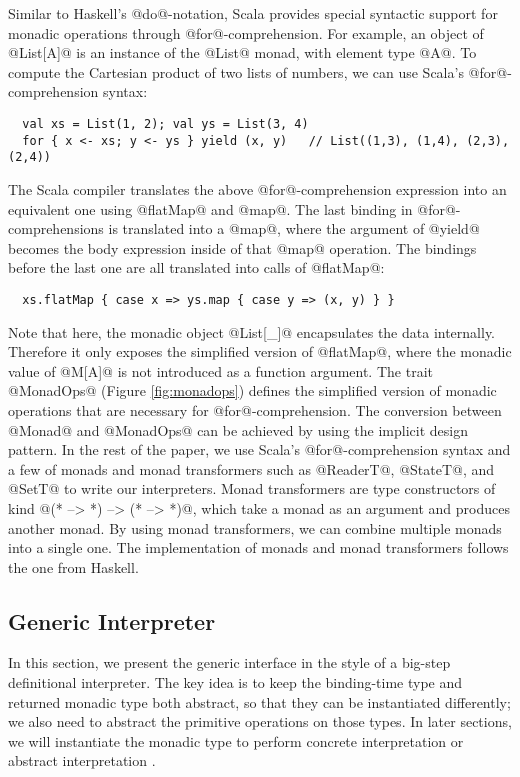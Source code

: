 Similar to Haskell's @do@-notation, Scala provides special syntactic support
for monadic operations through @for@-comprehension.  For example, an object of
@List[A]@ is an instance of the @List@ monad, with element type @A@.
To compute the Cartesian product of two lists of numbers, we can use Scala's
@for@-comprehension syntax:
\begin{lstlisting}
  val xs = List(1, 2); val ys = List(3, 4)
  for { x <- xs; y <- ys } yield (x, y)   // List((1,3), (1,4), (2,3), (2,4))
\end{lstlisting}

The Scala compiler translates the above @for@-comprehension expression into
an equivalent one using @flatMap@ and @map@. The last binding
in @for@-comprehensions is translated into a @map@, where the argument of
@yield@ becomes the body expression inside of that @map@ operation. The
bindings before the last one are all translated into calls of @flatMap@:
\begin{lstlisting}
  xs.flatMap { case x => ys.map { case y => (x, y) } }
\end{lstlisting}

Note that here, the monadic object @List[_]@ encapsulates the data internally.
Therefore it only exposes the simplified version of @flatMap@, where the monadic
value of @M[A]@ is not introduced as a function argument. The trait @MonadOps@ (Figure
\ref{fig:monadops}) defines the simplified version of monadic operations that
are necessary for @for@-comprehension. The conversion between @Monad@ and
@MonadOps@ can be achieved by using the implicit design pattern.
In the rest of the paper, we use Scala's @for@-comprehension syntax and a few
of monads and monad transformers such as @ReaderT@, @StateT@, and @SetT@ to
write our interpreters.
Monad transformers are type constructors of kind @(* --> *) --> (* --> *)@, which
take a monad as an argument and produces another monad. By using monad
transformers, we can combine multiple monads into a single one.  The
implementation of monads and monad transformers follows the one from Haskell.

\subsection{Generic Interpreter} \label{generic_if}

In this section, we present the generic interface in the style of a big-step
definitional interpreter. The key idea is to keep the binding-time type and
returned monadic type both abstract, so that they can be instantiated
differently; we also need to abstract the primitive operations on those types.
In later sections, we will instantiate the monadic type to perform concrete
interpretation \citet{DBLP:conf/popl/LiangHJ95} or abstract interpretation
\cite{Sergey:2013:MAI:2491956.2491979, DBLP:journals/pacmpl/DaraisLNH17}.

